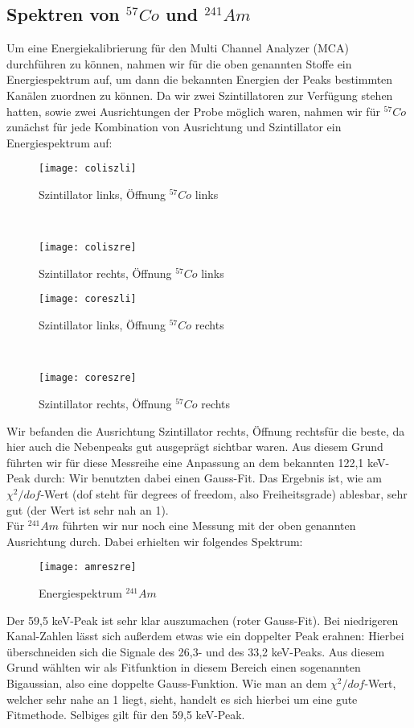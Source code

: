 \subsection{Spektren von $^{57}Co$ und $^{241}Am$}
Um eine Energiekalibrierung für den Multi Channel Analyzer (MCA) durchführen zu können, nahmen wir für die oben genannten Stoffe ein Energiespektrum auf, um dann die bekannten Energien der Peaks bestimmten Kanälen zuordnen zu können. Da  wir zwei Szintillatoren zur Verfügung stehen hatten, sowie zwei Ausrichtungen der Probe möglich waren, nahmen wir für $^{57}Co$ zunächst für jede Kombination von Ausrichtung und Szintillator ein Energiespektrum auf:\\
\begin{figure}[h] 
\texttt{[image: coliszli]}
\caption{Szintillator links, Öffnung $^{57}Co$ links}
\end{figure} \\
\begin{figure}[h]
\texttt{[image: coliszre]}
\caption{Szintillator rechts, Öffnung $^{57}Co$ links}
\end{figure}
\begin{figure}[h]
\texttt{[image: coreszli]}
\caption{Szintillator links, Öffnung $^{57}Co$ rechts}
\end{figure}
~\clearpage
\begin{figure}[h] 
\texttt{[image: coreszre]}
\caption{Szintillator rechts, Öffnung $^{57}Co$ rechts}
\end{figure} 
Wir befanden die Ausrichtung \glqq Szintillator rechts, Öffnung rechts\grqq für die beste, da hier auch die Nebenpeaks gut ausgeprägt sichtbar waren. Aus diesem Grund führten wir für diese Messreihe eine Anpassung an dem bekannten 122,1 keV-Peak durch: Wir benutzten dabei einen Gauss-Fit. Das Ergebnis ist, wie am $\chi^2/dof$-Wert (dof steht für \glqq degrees of freedom\grqq, also Freiheitsgrade) ablesbar, sehr gut (der Wert ist sehr nah an 1). \\
Für $^{241}Am$ führten wir nur noch eine Messung mit der oben genannten Ausrichtung durch. Dabei erhielten wir folgendes Spektrum:
\begin{figure}[h] 
\texttt{[image: amreszre]}
\caption{Energiespektrum $^{241}Am$}
\end{figure}
\clearpage
Der 59,5 keV-Peak ist sehr klar auszumachen (roter Gauss-Fit). Bei niedrigeren Kanal-Zahlen lässt sich außerdem etwas wie ein doppelter Peak erahnen: Hierbei überschneiden sich die Signale des 26,3- und des 33,2 keV-Peaks. Aus diesem Grund wählten wir als Fitfunktion in diesem Bereich einen sogenannten \glqq Bigaussian\grqq, also eine doppelte Gauss-Funktion. Wie man an dem $\chi^2/dof$-Wert, welcher sehr nahe an 1 liegt, sieht, handelt es sich hierbei um eine gute Fitmethode. Selbiges gilt für den 59,5 keV-Peak.\\
